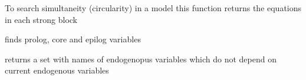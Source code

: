 \documentclass[letterpaper,10pt,english]{sphinxmanual}
\begin{document}
\begin{fulllineitems}

\begin{fulllineitems}
\label{\detokenize{core/modelclass:modelclass.Graph_Mixin.strongtype}}
\pysigstartsignatures
{}
\pysigstopsignatures
\end{fulllineitems}


\begin{fulllineitems}
\label{\detokenize{core/modelclass:modelclass.Graph_Mixin.strongfrml}}
\pysigstartsignatures
{}
\pysigstopsignatures
\sphinxAtStartPar
To search simultaneity (circularity) in a model
this function returns the equations in each strong block

\end{fulllineitems}


\begin{fulllineitems}
\label{\detokenize{core/modelclass:modelclass.Graph_Mixin.superblock}}
\pysigstartsignatures
{}
\pysigstopsignatures
\sphinxAtStartPar
finds prolog, core and epilog variables

\end{fulllineitems}


\begin{fulllineitems}
\label{\detokenize{core/modelclass:modelclass.Graph_Mixin.prevar}}
\pysigstartsignatures
{}
\pysigstopsignatures
\sphinxAtStartPar
returns a set with names of endogenopus variables which do not depend
on current endogenous variables

\end{fulllineitems}


\end{fulllineitems}
\end{document}
